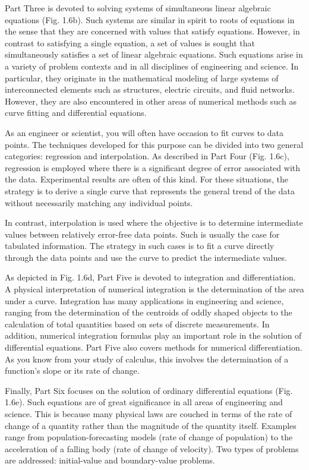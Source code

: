 \documentclass[../main.tex]{subfiles}
\begin{document}
Part Three is devoted to solving systems of simultaneous linear algebraic equations
(Fig. 1.6b). Such systems are similar in spirit to roots of equations in the sense that they are
concerned with values that satisfy equations. However, in contrast to satisfying a single
equation, a set of values is sought that simultaneously satisfies a set of linear algebraic
equations. Such equations arise in a variety of problem contexts and in all disciplines of engineering and 
science. In particular, they originate in the mathematical modeling of large
systems of interconnected elements such as structures, electric circuits, and fluid networks.
However, they are also encountered in other areas of numerical methods such as curve fitting and differential equations.


As an engineer or scientist, you will often have occasion to fit curves to data points.
The techniques developed for this purpose can be divided into two general categories:
regression and interpolation. As described in Part Four (Fig. 1.6c), regression is
employed where there is a significant degree of error associated with the data. Experimental results are often of this kind. For these situations, the strategy is to derive a single curve that represents the general trend of the data without necessarily matching any
individual points.

In contrast, interpolation is used where the objective is to determine intermediate values between relatively error-free data points. Such is usually the case for tabulated information. The strategy in such cases is to fit a curve directly through the data points and use
the curve to predict the intermediate values.


As depicted in Fig. 1.6d, Part Five is devoted to integration and differentiation. A
physical interpretation of numerical integration is the determination of the area under a
curve. Integration has many applications in engineering and science, ranging from the
determination of the centroids of oddly shaped objects to the calculation of total quantities based on sets 
of discrete measurements. In addition, numerical integration formulas play an important role in the solution of 
differential equations. Part Five also covers
methods for numerical differentiation. As you know from your study of calculus, this
involves the determination of a function's slope or its rate of change.


Finally, Part Six focuses on the solution of ordinary differential equations (Fig. 1.6e).
Such equations are of great significance in all areas of engineering and science. This is
because many physical laws are couched in terms of the rate of change of a quantity rather
than the magnitude of the quantity itself. Examples range from population-forecasting
models (rate of change of population) to the acceleration of a falling body (rate of change
of velocity). Two types of problems are addressed: initial-value and boundary-value
problems.
\end{document}
